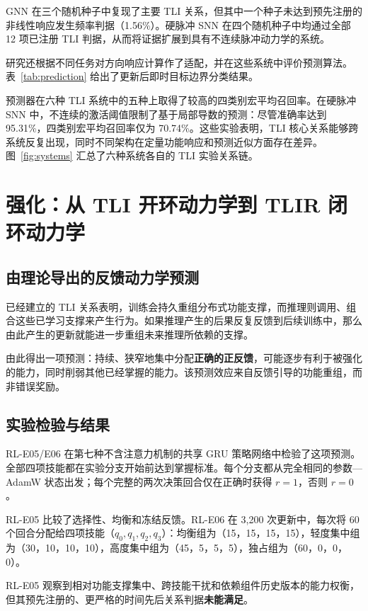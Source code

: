 GNN 在三个随机种子中复现了主要 TLI 关系，但其中一个种子未达到预先注册的非线性响应发生频率判据（1.56\%）。硬脉冲 SNN 在四个随机种子中均通过全部 12 项已注册 TLI 判据，从而将证据扩展到具有不连续脉冲动力学的系统。

研究还根据不同任务对方向响应计算作了适配，并在这些系统中评价预测算法。表~\ref{tab:prediction} 给出了更新后即时目标边界分类结果。

预测器在六种 TLI 系统中的五种上取得了较高的四类别宏平均召回率。在硬脉冲 SNN 中，不连续的激活阈值限制了基于局部导数的预测：尽管准确率达到 95.31\%，四类别宏平均召回率仅为 70.74\%。这些实验表明，TLI 核心关系能够跨系统反复出现，同时不同架构在定量功能响应和预测近似方面存在差异。图~\ref{fig:systems} 汇总了六种系统各自的 TLI 实验关系链。

\section{强化：从 TLI 开环动力学到 TLIR 闭环动力学}
\label{sec:reinforcement}

\subsection{由理论导出的反馈动力学预测}

已经建立的 TLI 关系表明，训练会持久重组分布式功能支撑，而推理则调用、组合这些已学习支撑来产生行为。如果推理产生的后果反复反馈到后续训练中，那么由此产生的更新就能进一步重组未来推理所依赖的支撑。

由此得出一项预测：持续、狭窄地集中分配\textbf{正确的正反馈}，可能逐步有利于被强化的能力，同时削弱其他已经掌握的能力。该预测效应来自反馈引导的功能重组，而非错误奖励。

\subsection{实验检验与结果}

RL-E05/E06 在第七种不含注意力机制的共享 GRU 策略网络中检验了这项预测。全部四项技能都在实验分支开始前达到掌握标准。每个分支都从完全相同的参数—AdamW 状态出发；每个完整的两次决策回合仅在正确时获得 $r=1$，否则 $r=0$。

RL-E05 比较了选择性、均衡和冻结反馈。RL-E06 在 3,200 次更新中，每次将 60 个回合分配给四项技能（$q_0,q_1,q_2,q_3$）：均衡组为（15，15，15，15），轻度集中组为（30，10，10，10），高度集中组为（45，5，5，5），独占组为（60，0，0，0）。

RL-E05 观察到相对功能支撑集中、跨技能干扰和依赖组件历史版本的能力权衡，但其预先注册的、更严格的时间先后关系判据\textbf{未能满足}。

